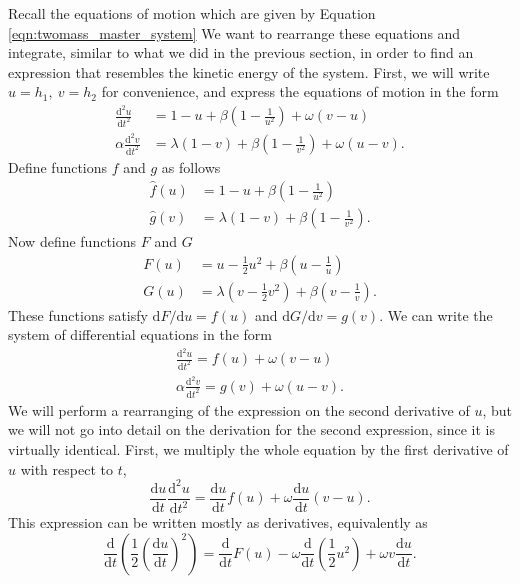\documentclass{article}
\begin{document}
Recall the equations of motion which are given by Equation \ref{eqn:twomass_master_system}
We want to rearrange these equations and integrate, similar to what we did in the previous section, in order to find an expression that resembles the kinetic energy of the system.
First, we will write \(u = h_1,~v=h_2\) for convenience, and express the equations of motion in the form
\begin{align*}
    \frac{\mathrm{d}^2 u}{\mathrm{d}t^2} &= 1 - u + \beta\left(1-\frac{1}{u^2}\right) + \omega(v-u) \\
    \alpha\frac{\mathrm{d}^2 v}{\mathrm{d}t^2} &= \lambda(1 - v) + \beta\left(1-\frac{1}{v^2}\right) + \omega(u-v).
\end{align*}
Define functions $f$ and $g$ as follows
\begin{align*}
    \hat{f}(u) &= 1-u + \beta\left(1-\frac{1}{u^2}\right) \\
    \hat{g}(v) &= \lambda(1-v) + \beta\left( 1-\frac{1}{v^2} \right).
\end{align*}
Now define functions $F$ and $G$
\begin{align*}
    F(u) &= u - \frac{1}{2}u^2 + \beta\left(u - \frac{1}{u} \right) \\
    G(u) &= \lambda\left( v - \frac{1}{2}v^2 \right) + \beta\left( v - \frac{1}{v}\right).
\end{align*}
These functions satisfy \(\mathrm{d}F/\mathrm{d}u = f(u)\) and \(\mathrm{d}G/\mathrm{d}v = g(v)\).
We can write the system of differential equations in the form
\begin{align*}
    \frac{\mathrm{d}^2 u}{\mathrm{d}t^2} = f(u) + \omega(v-u) \\
    \alpha\frac{\mathrm{d}^2 v}{\mathrm{d}t^2} = g(v) + \omega(u-v).
\end{align*}
We will perform a rearranging of the expression on the second derivative of $u$,
but we will not go into detail on the derivation for the second expression,
since it is virtually identical.
First, we multiply the whole equation by the first derivative of $u$ with respect to $t$,
\begin{equation*}
    \frac{\mathrm{d}u}{\mathrm{d}t}\frac{\mathrm{d}^2 u}{\mathrm{d}t^2} = \frac{\mathrm{d}u}{\mathrm{d}t}f(u) + \omega \frac{\mathrm{d}u}{\mathrm{d}t}(v-u).
\end{equation*}
This expression can be written mostly as derivatives, equivalently as
\begin{equation*}
    \frac{\mathrm{d}}{\mathrm{d}t}\left(
        \frac{1}{2}\left(\frac{\mathrm{d}u}{\mathrm{d}t}\right)^2
     \right) = \frac{\mathrm{d}}{\mathrm{d}t}F(u) - \omega\frac{\mathrm{d}}{\mathrm{d}t}\left(\frac{1}{2}u^2\right) + \omega v \frac{\mathrm{d}u}{\mathrm{d}t}.
\end{equation*}
\end{document}
